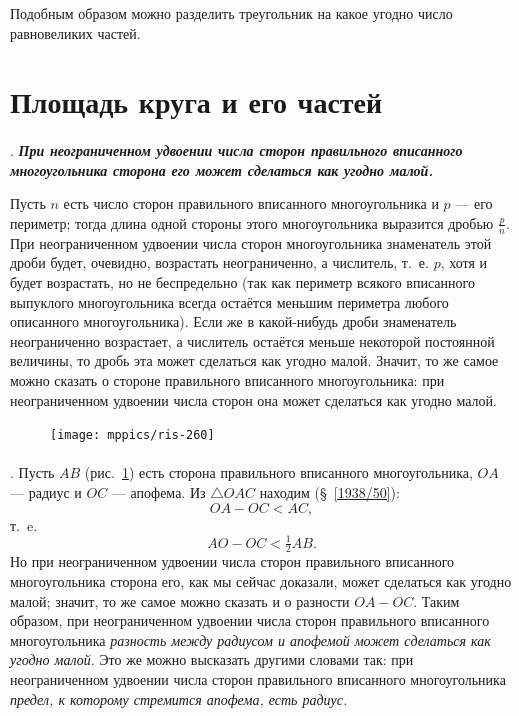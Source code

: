 \documentclass[oneside]{book}
\begin{document}
Подобным образом можно разделить треугольник на какое угодно число равновеликих частей.

\section{Площадь круга и его частей}

\paragraph{}\label{1938/262}
.
\textbf{\emph{При неограниченном удвоении числа сторон правильного вписанного многоугольника сторона его может сделаться как угодно малой.}}

Пусть $n$ есть число сторон правильного вписанного многоугольника и $p$ — его периметр;
тогда длина одной стороны этого многоугольника выразится дробью $\tfrac pn$.
При неограниченном удвоении числа сторон многоугольника знаменатель этой дроби будет, очевидно, возрастать неограниченно, а числитель, т.~е. $p$, хотя и будет возрастать, но не беспредельно (так как периметр всякого вписанного выпуклого многоугольника всегда остаётся меньшим периметра любого описанного многоугольника).
Если же в какой-нибудь дроби знаменатель неограниченно возрастает, а числитель остаётся меньше некоторой постоянной величины, то дробь эта может сделаться как угодно малой.
Значит, то же самое можно сказать о стороне правильного вписанного многоугольника:
при неограниченном удвоении числа сторон она может сделаться как угодно малой.

\begin{figure}
\centering
\texttt{[image: mppics/ris-260]}
\caption{}\label{1938/ris-260}
\end{figure}

\paragraph{}\label{1938/263}
\mbox{.}
Пусть $AB$ (рис.~\ref{1938/ris-260}) есть сторона правильного вписанного многоугольника, $OA$ — радиус и $OC$ — апофема.
Из $\triangle OAC$ находим (§~\ref{1938/50}):
\[OA-OC<AC,\]
т.~e.
\[AO-OC<\tfrac12 AB.\]
Но при неограниченном удвоении числа сторон правильного вписанного многоугольника сторона его, как мы сейчас доказали, может сделаться как угодно малой;
значит, то же самое можно сказать и о разности $OA-OC$.
Таким образом, при неограниченном удвоении числа сторон правильного вписанного многоугольника \emph{разность между радиусом и апофемой может сделаться как угодно малой}.
Это же можно высказать другими словами так:
при неограниченном удвоении числа сторон правильного вписанного многоугольника \emph{предел, к которому стремится апофема, есть радиус.}
\end{document}

